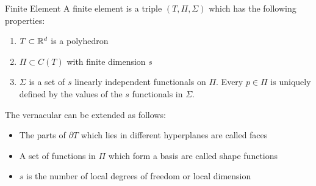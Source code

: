 \begin{defn}{Finite Element}
    A finite element is a triple $(T, \Pi,\Sigma)$ which has the following properties:
    \label{def:finite_element}
    \begin{enumerate}
        \item $T\subset \mathbb{R}^d$ is a polyhedron
        \item $\Pi \subset C(T)$ with finite dimension $s$
        \item $\Sigma$ is a set of $s$ linearly independent functionals on $\Pi$. 
        Every $p\in \Pi$ is uniquely defined by the values of the $s$ functionals in $\Sigma$.
    \end{enumerate}
\end{defn}
The vernacular can be extended as follows:
\begin{itemize}
    \item The parts of $\partial T$ which lies in different hyperplanes are called faces
    \item A set of functions in $\Pi$ which form a basis are called shape functions 
    \item $s$ is the number of local degrees of freedom or local dimension
\end{itemize}